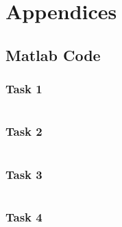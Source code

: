 \documentclass[9pt]{article}
\begin{document}
 \appendix
 \section*{Appendices}\label{appendix:main}%
 \renewcommand{\thesubsection}{\Alph{subsection}}

 \subsection{Matlab Code}
 \subsubsection{Task 1} \label{matlabs:task1}
 \begin{scriptsize}
    \inputminted{matlab}{Project/Matlab/Scripts/Task1.m}
 \end{scriptsize}

 \subsubsection{Task 2} \label{matlabs:task2}
 \begin{scriptsize}
    \inputminted{matlab}{Project/Matlab/Scripts/Task2.m}
 \end{scriptsize}

 \subsubsection{Task 3} \label{matlabs:task3}
 \begin{scriptsize}
    \inputminted{matlab}{Project/Matlab/Scripts/Task3.m}
 \end{scriptsize}

 \subsubsection{Task 4} \label{matlabs:task4}
 \begin{scriptsize}
    \inputminted{matlab}{Project/Matlab/QPSKTransmitterAndReceiverSimulinkExample/Task4_.m}
 \end{scriptsize}

\end{document}
